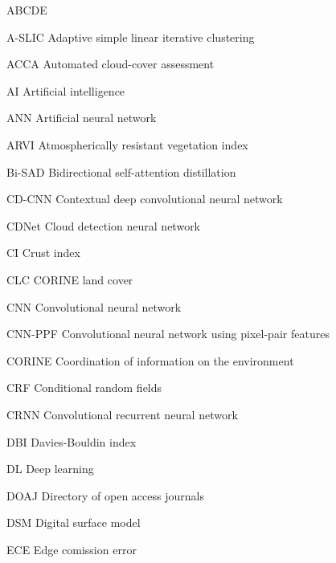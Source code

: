 
\begin{seznamzkratek}{ABCDE}

	      {A-SLIC}
	      {\qquad Adaptive simple linear iterative clustering}

	      {ACCA}
	      {\qquad Automated cloud-cover assessment}

	      {AI}
	      {\qquad Artificial intelligence}

	      {ANN}
	      {\qquad Artificial neural network}

	      {ARVI}
	      {\qquad Atmospherically resistant vegetation index}

	      {Bi-SAD}
	      {\qquad Bidirectional self-attention distillation}

	      {CD-CNN}
	      {\hspace{5.0mm} Contextual deep convolutional neural network}

	      {CDNet}
	      {\qquad Cloud detection neural network}

	      {CI}
	      {\qquad Crust index}

	      {CLC}
	      {\qquad CORINE land cover}

	      {CNN}
	      {\qquad Convolutional neural network}

	      {CNN-PPF}
	      {\hspace{2.9mm} Convolutional neural network using pixel-pair features}

	      {CORINE}
	      {\hspace{5.0mm} Coordination of information on the environment}

	      {CRF}
	      {\qquad Conditional random fields}

	      {CRNN}
	      {\qquad Convolutional recurrent neural network}

	      {DBI}
	      {\qquad Davies-Bouldin index}

	      {DL}
	      {\qquad Deep learning}

	      {DOAJ}
	      {\qquad Directory of open access journals}

	      {DSM}
	      {\qquad Digital surface model}

	      {ECE}
	      {\qquad Edge comission error}


\end{seznamzkratek}
